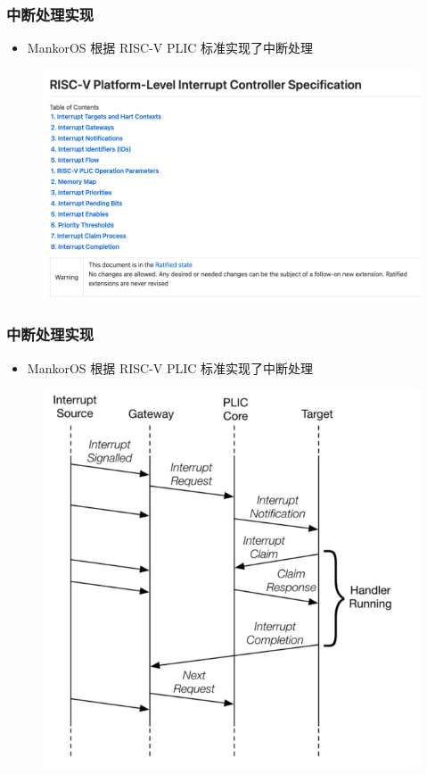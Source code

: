 \begin{frame}
    \frametitle{中断处理实现}

    \begin{itemize}
        \item MankorOS 根据 RISC-V PLIC 标准实现了中断处理
    \end{itemize}

    \begin{figure}
        \includegraphics[width=.5\textwidth]{assets/plic.png}
    \end{figure}

\end{frame}

\begin{frame}
    \frametitle{中断处理实现}

    \begin{itemize}
        \item MankorOS 根据 RISC-V PLIC 标准实现了中断处理
    \end{itemize}

    \begin{figure}
        \includegraphics[width=.4\textwidth]{assets/plic-flow.jpg}
    \end{figure}

\end{frame}